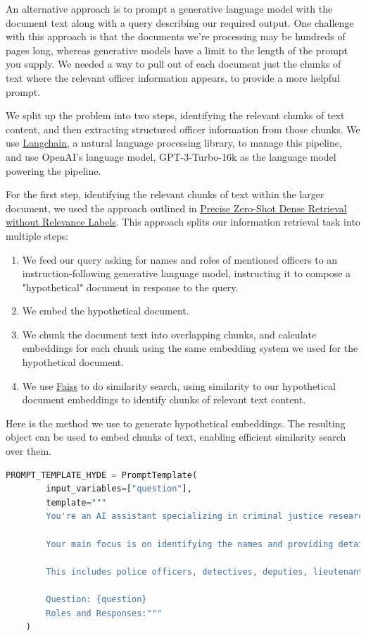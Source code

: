\documentclass{article}
\begin{document}
An alternative approach is to prompt a generative language model with the document text along with a query describing our required output. One challenge with this approach is that the documents we're processing may be hundreds of pages long, whereas generative models have a limit to the length of the prompt you supply. We needed a way to pull out of each document just the chunks of text where the relevant officer information appears, to provide a more helpful prompt.

We split up the problem into two steps, identifying the relevant chunks of text content, and then extracting structured officer information from those chunks. We use \href{https://docs.langchain.com/docs/}{Langchain}, a natural language processing library, to manage this pipeline, and use OpenAI's language model, GPT-3-Turbo-16k as the language model powering the pipeline.

For the first step, identifying the relevant chunks of text within the larger document, we used the approach outlined in \href{https://arxiv.org/abs/2212.10496}{Precise Zero-Shot Dense Retrieval without Relevance Labels}. This approach splits our information retrieval task into multiple steps:

\begin{enumerate}
    \item We feed our query asking for names and roles of mentioned officers to an instruction-following generative language model, instructing it to compose a "hypothetical" document in response to the query.
    \item We embed the hypothetical document.
    \item We chunk the document text into overlapping chunks, and calculate embeddings for each chunk using the same embedding system we used for the hypothetical document.
    \item We use \href{https://faiss.ai/}{Faiss} to do similarity search, using similarity to our hypothetical document embeddings to identify chunks of relevant text content.
\end{enumerate}

Here is the method we use to generate hypothetical embeddings. The resulting object can be used to embed chunks of text, enabling efficient similarity search over them.

\begin{lstlisting}[language=Python, caption=Code Snippet 2, breaklines=true]
    PROMPT_TEMPLATE_HYDE = PromptTemplate(
        input_variables=["question"],
        template="""
        You're an AI assistant specializing in criminal justice research. 
        
        Your main focus is on identifying the names and providing detailed context of mention for each law enforcement personnel. 
        
        This includes police officers, detectives, deputies, lieutenants, sergeants, captains, technicians, coroners, investigators, patrolmen, and criminalists, as described in court transcripts and police reports.

        Question: {question}
        Roles and Responses:"""
    )
\end{lstlisting}
\end{document}

